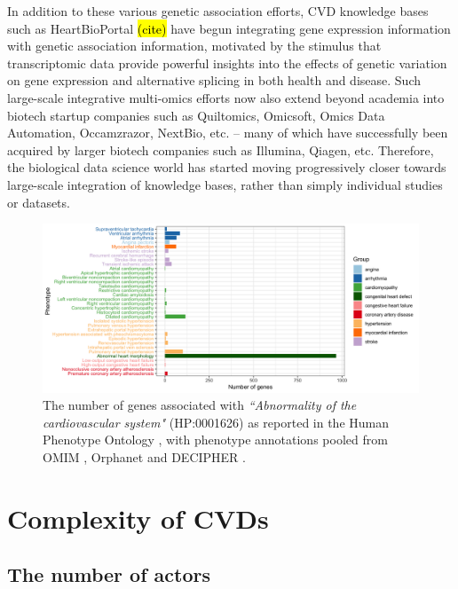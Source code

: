 \documentclass[letter]{bioinfo}
\begin{document}
	In addition to these various genetic association efforts, CVD knowledge bases such as HeartBioPortal \hl{(cite)} have begun integrating gene expression information with genetic association information, motivated by the stimulus that transcriptomic data provide powerful insights into the effects of genetic variation on gene expression and alternative splicing in both health and disease.  Such large-scale integrative multi-omics efforts now also extend beyond academia into biotech startup companies such as Quiltomics, Omicsoft, Omics Data Automation, Occamzrazor, NextBio, etc. -- many of which have successfully been acquired by larger biotech companies such as Illumina, Qiagen, etc.  Therefore, the biological data science world has started moving progressively closer towards large-scale integration of knowledge bases, rather than simply individual studies or datasets.    


		\begin{figure}[!tpb]
		\includegraphics[width=1.\linewidth]{hpo-gene-count}
		\caption{The number of genes associated with \emph{``Abnormality of the cardiovascular system"} (HP:0001626) as reported in the Human Phenotype Ontology \citep{Kohler:2014:Human},
			 with phenotype annotations pooled from OMIM \citep{McKusick:2018:OMIM} , Orphanet \citep{INSERM:1997:Orphanet}  and DECIPHER \citep{Firth:2009:DECIPHER}.}
		\label{fig:hpo_gene_count}	
	\end{figure}
	
	
	
	
	\section*{Complexity of CVDs}  %
	\subsection*{The number of actors}
	
\end{document}
